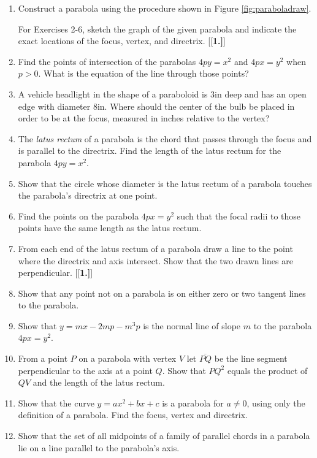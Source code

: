 \divider
\vspace{2mm}
\startexercises\label{sec7dot2}
{\small
{}
\begin{enumerate}[\bfseries 1.]
 \item Construct a parabola using the procedure shown in Figure
  \ref{fig:paraboladraw}.
\par\noindent For Exercises 2-6, sketch the graph of the given parabola and
indicate the exact locations of the focus, vertex, and directrix.
[{[\bfseries 1.]}]
 \item Find the points of intersection of the parabolas $4py=x^2$ and $4px=y^2$
  when $p>0$. What is the equation of the line through those points?
 \item A vehicle headlight in the shape of a paraboloid is 3in deep and has an
  open edge with diameter 8in. Where should the center of the bulb be placed in
  order to be at the focus, measured in inches relative to the vertex?
 \item The \emph{latus rectum} of a parabola is the
  chord that passes through the focus and is parallel to the directrix. Find the
  length of the latus rectum for the parabola $4py=x^2$.
 \item Show that the circle whose diameter is the latus rectum of a parabola
  touches the parabola's directrix at one point.
 \item Find the points on the parabola $4px=y^2$ such that the focal radii to
  those points have the same length as the latus rectum.
 \item From each end of the latus rectum of a parabola draw a line to the point
  where the directrix and axis intersect. Show that the two drawn lines are
  perpendicular.
[{[\bfseries 1.]}]
 \item Show that any point not on a parabola is on either zero or two tangent
  lines to the parabola.
 \item Show that $y=mx-2mp-m^3p$ is the normal line of slope $m$ to the parabola
  $4px=y^2$.
 \item From a point $P$ on a parabola with vertex $V$ let $\overline{PQ}$ be the
  line segment perpendicular to the axis at a point $Q$. Show that $PQ^2$ equals
  the product of $QV$ and the length of the latus rectum.
 \item Show that the curve $y=ax^2+bx+c$ is a parabola for $a \ne 0$, using only
  the definition of a parabola. Find the focus, vertex and directrix.
 \item Show that the set of all midpoints of a family of parallel chords in a
  parabola lie on a line parallel to the parabola's axis.
\end{enumerate}
}
\newpage
